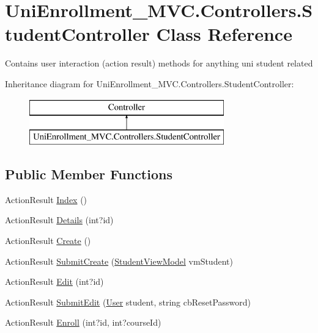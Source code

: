 \hypertarget{class_uni_enrollment___m_v_c_1_1_controllers_1_1_student_controller}{}\section{Uni\+Enrollment\+\_\+\+M\+V\+C.\+Controllers.\+Student\+Controller Class Reference}
\label{class_uni_enrollment___m_v_c_1_1_controllers_1_1_student_controller}


Contains user interaction (action result) methods for anything uni \textquotesingle{}student\textquotesingle{} related  


Inheritance diagram for Uni\+Enrollment\+\_\+\+M\+V\+C.\+Controllers.\+Student\+Controller\+:\begin{figure}[H]
\begin{center}
\leavevmode
\includegraphics[height=2.000000cm]{class_uni_enrollment___m_v_c_1_1_controllers_1_1_student_controller}
\end{center}
\end{figure}
\subsection*{Public Member Functions}
\begin{DoxyCompactItemize}
\item 
Action\+Result \hyperlink{class_uni_enrollment___m_v_c_1_1_controllers_1_1_student_controller_a99a55aa0fd266130c87e5f3f410e18f0}{Index} ()
\item 
Action\+Result \hyperlink{class_uni_enrollment___m_v_c_1_1_controllers_1_1_student_controller_aa4f0e88839e2e96649fbaea4299dfded}{Details} (int?id)
\item 
Action\+Result \hyperlink{class_uni_enrollment___m_v_c_1_1_controllers_1_1_student_controller_a536100310cf7d5e404261a12a3d3a253}{Create} ()
\item 
Action\+Result \hyperlink{class_uni_enrollment___m_v_c_1_1_controllers_1_1_student_controller_a10b15f59171956321ff191dc610d1e70}{Submit\+Create} (\hyperlink{class_uni_enrollment___m_v_c_1_1_models_1_1_student_view_model}{Student\+View\+Model} vm\+Student)
\item 
Action\+Result \hyperlink{class_uni_enrollment___m_v_c_1_1_controllers_1_1_student_controller_a77fefd6af44dd913321444732fbf9d52}{Edit} (int?id)
\item 
Action\+Result \hyperlink{class_uni_enrollment___m_v_c_1_1_controllers_1_1_student_controller_aa2419626ede0b89e2eb4b4f4a8c8d5b7}{Submit\+Edit} (\hyperlink{class_uni_enrollment___m_v_c_1_1_models_1_1_user}{User} student, string cb\+Reset\+Password)
\item 
Action\+Result \hyperlink{class_uni_enrollment___m_v_c_1_1_controllers_1_1_student_controller_a954503cf9b679ce49e70678dc6511552}{Enroll} (int?id, int?course\+Id)
\end{DoxyCompactItemize}
